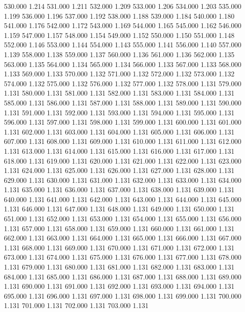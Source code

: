 530.000 1.214 
531.000 1.211 
532.000 1.209 
533.000 1.206 
534.000 1.203 
535.000 1.199 
536.000 1.196 
537.000 1.192 
538.000 1.188 
539.000 1.184 
540.000 1.180 
541.000 1.176 
542.000 1.172 
543.000 1.169 
544.000 1.165 
545.000 1.162 
546.000 1.159 
547.000 1.157 
548.000 1.154 
549.000 1.152 
550.000 1.150 
551.000 1.148 
552.000 1.146 
553.000 1.144 
554.000 1.143 
555.000 1.141 
556.000 1.140 
557.000 1.139 
558.000 1.138 
559.000 1.137 
560.000 1.136 
561.000 1.136 
562.000 1.135 
563.000 1.135 
564.000 1.134 
565.000 1.134 
566.000 1.133 
567.000 1.133 
568.000 1.133 
569.000 1.133 
570.000 1.132 
571.000 1.132 
572.000 1.132 
573.000 1.132 
574.000 1.132 
575.000 1.132 
576.000 1.132 
577.000 1.132 
578.000 1.131 
579.000 1.131 
580.000 1.131 
581.000 1.131 
582.000 1.131 
583.000 1.131 
584.000 1.131 
585.000 1.131 
586.000 1.131 
587.000 1.131 
588.000 1.131 
589.000 1.131 
590.000 1.131 
591.000 1.131 
592.000 1.131 
593.000 1.131 
594.000 1.131 
595.000 1.131 
596.000 1.131 
597.000 1.131 
598.000 1.131 
599.000 1.131 
600.000 1.131 
601.000 1.131 
602.000 1.131 
603.000 1.131 
604.000 1.131 
605.000 1.131 
606.000 1.131 
607.000 1.131 
608.000 1.131 
609.000 1.131 
610.000 1.131 
611.000 1.131 
612.000 1.131 
613.000 1.131 
614.000 1.131 
615.000 1.131 
616.000 1.131 
617.000 1.131 
618.000 1.131 
619.000 1.131 
620.000 1.131 
621.000 1.131 
622.000 1.131 
623.000 1.131 
624.000 1.131 
625.000 1.131 
626.000 1.131 
627.000 1.131 
628.000 1.131 
629.000 1.131 
630.000 1.131 
631.000 1.131 
632.000 1.131 
633.000 1.131 
634.000 1.131 
635.000 1.131 
636.000 1.131 
637.000 1.131 
638.000 1.131 
639.000 1.131 
640.000 1.131 
641.000 1.131 
642.000 1.131 
643.000 1.131 
644.000 1.131 
645.000 1.131 
646.000 1.131 
647.000 1.131 
648.000 1.131 
649.000 1.131 
650.000 1.131 
651.000 1.131 
652.000 1.131 
653.000 1.131 
654.000 1.131 
655.000 1.131 
656.000 1.131 
657.000 1.131 
658.000 1.131 
659.000 1.131 
660.000 1.131 
661.000 1.131 
662.000 1.131 
663.000 1.131 
664.000 1.131 
665.000 1.131 
666.000 1.131 
667.000 1.131 
668.000 1.131 
669.000 1.131 
670.000 1.131 
671.000 1.131 
672.000 1.131 
673.000 1.131 
674.000 1.131 
675.000 1.131 
676.000 1.131 
677.000 1.131 
678.000 1.131 
679.000 1.131 
680.000 1.131 
681.000 1.131 
682.000 1.131 
683.000 1.131 
684.000 1.131 
685.000 1.131 
686.000 1.131 
687.000 1.131 
688.000 1.131 
689.000 1.131 
690.000 1.131 
691.000 1.131 
692.000 1.131 
693.000 1.131 
694.000 1.131 
695.000 1.131 
696.000 1.131 
697.000 1.131 
698.000 1.131 
699.000 1.131 
700.000 1.131 
701.000 1.131 
702.000 1.131 
703.000 1.131 
